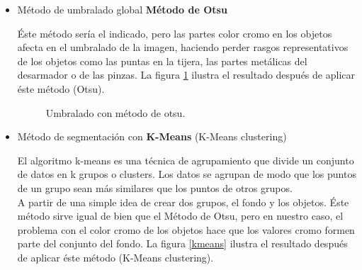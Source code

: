 \documentclass[a4paper, 11pt]{article}
\begin{document}
\begin{itemize}
\item Método de umbralado global \textbf{Método de Otsu}

  Éste método sería el indicado, pero las partes color cromo en los objetos afecta en el umbralado de la imagen, haciendo perder rasgos representativos de los objetos como las puntas en la tijera, las partes metálicas del desarmador o de las pinzas. La figura \ref{otsu} ilustra el resultado después de aplicar éste método (Otsu).
  
  \begin{figure}[ht]%
    \centering
    \qquad
    \caption{Umbralado con método de otsu.}%
    \label{otsu}%
\end{figure}
  
\item Método de segmentación con \textbf{K-Means} (K-Means clustering)

  El algoritmo k-means es una técnica de agrupamiento que divide un conjunto de datos en k grupos o clusters. Los datos se agrupan de modo que los puntos de un grupo sean más similares que los puntos de otros grupos.\\
  
  A partir de una simple idea de crear dos grupos, el fondo y los objetos. Éste método sirve igual de bien que el Método de Otsu, pero en nuestro caso, el problema con el color cromo de los objetos hace que los valores cromo formen parte del conjunto del fondo. La figura \ref{kmeans} ilustra el resultado después de aplicar éste método (K-Means clustering).
  

\end{itemize}
\end{document}
